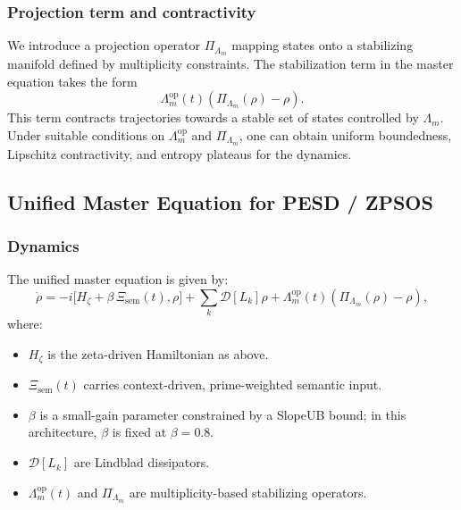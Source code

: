 \documentclass[11pt]{article}
\begin{document}
\subsubsection{Projection term and contractivity}

We introduce a projection operator \(\Pi_{\Lambda_m}\) mapping states onto a stabilizing manifold defined by multiplicity constraints. The stabilization term in the master equation takes the form
\begin{equation}
  \Lambda_m^{\mathrm{op}}(t) \left( \Pi_{\Lambda_m}(\rho) - \rho \right).
\end{equation}
This term contracts trajectories towards a stable set of states controlled by \(\Lambda_m\). Under suitable conditions on \(\Lambda_m^{\mathrm{op}}\) and \(\Pi_{\Lambda_m}\), one can obtain uniform boundedness, Lipschitz contractivity, and entropy plateaus for the dynamics.

\subsection{Unified Master Equation for PESD / ZPSOS}

\subsubsection{Dynamics}

The unified master equation is given by:
\begin{equation}
\label{eq:pesd-master}
  \dot{\rho}
  = -i \bigl[ H_\zeta + \beta\, \Xi_{\mathrm{sem}}(t), \rho \bigr]
    + \sum_k \mathcal{D}[L_k]\rho
    + \Lambda_m^{\mathrm{op}}(t)\left( \Pi_{\Lambda_m}(\rho) - \rho \right),
\end{equation}
where:
\begin{itemize}[nosep]
  \item \(H_\zeta\) is the zeta-driven Hamiltonian as above.
  \item \(\Xi_{\mathrm{sem}}(t)\) carries context-driven, prime-weighted semantic input.
  \item \(\beta\) is a small-gain parameter constrained by a SlopeUB bound; in this architecture, \(\beta\) is fixed at
        \(\beta = 0.8\).
  \item \(\mathcal{D}[L_k]\) are Lindblad dissipators.
  \item \(\Lambda_m^{\mathrm{op}}(t)\) and \(\Pi_{\Lambda_m}\) are multiplicity-based stabilizing operators.
\end{itemize}
\end{document}
